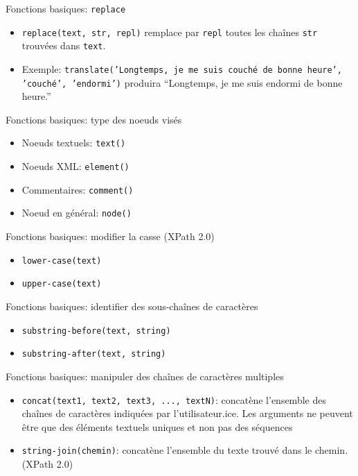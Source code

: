 \documentclass[11pt,aspectratio=169]{beamer}
\begin{document}
\begin{frame}{Fonctions basiques: \texttt{replace}}
\begin{itemize}
\item \texttt{replace(text, str, repl)} remplace par \texttt{repl} toutes les chaînes \texttt{str} trouvées dans \texttt{text}.
\item Exemple: \texttt{translate('Longtemps, je me suis couché de bonne heure', 'couché', 'endormi')} produira \enquote{Longtemps, je me suis endormi de bonne heure.}
\end{itemize}
\end{frame}


\begin{frame}{Fonctions basiques: type des noeuds visés}
\begin{itemize}
\item Noeuds textuels: \texttt{text()}
\item Noeuds XML: \texttt{element()}
\item Commentaires: \texttt{comment()}
\item Noeud en général: \texttt{node()}
\end{itemize}
\end{frame}

\begin{frame}{Fonctions basiques: modifier la casse (XPath 2.0)}
\begin{itemize}
\item \texttt{lower-case(text)}
\item \texttt{upper-case(text)}
\end{itemize}
\end{frame}


\begin{frame}{Fonctions basiques: identifier des sous-chaînes de caractères}
\begin{itemize}
\item \texttt{substring-before(text, string)}
\item \texttt{substring-after(text, string)}
\end{itemize}
\end{frame}


\begin{frame}{Fonctions basiques: manipuler des chaînes de caractères multiples }
\begin{itemize}
\item \texttt{concat(text1, text2, text3, ..., textN)}: concatène l'ensemble des chaînes de caractères indiquées par l'utilisateur.ice. Les arguments ne peuvent être que des éléments textuels uniques et non pas des séquences
\item \texttt{string-join(chemin)}: concatène l'ensemble du texte trouvé dans le chemin. (XPath 2.0)
\end{itemize}
\end{frame}
\end{document}
